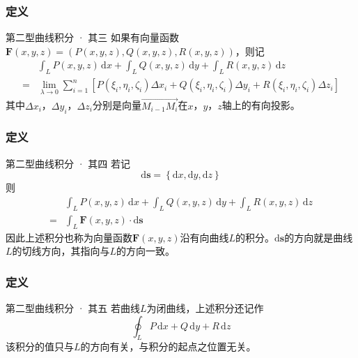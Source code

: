\documentclass[xetex]{beamer}
\begin{document}
    \begin{frame}
        \frametitle{定义}
    
        \begin{block}{第二型曲线积分 · 其三}
            如果有\alert{向量函数}$\mathbf{F}(x,y,z)=\left(P(x,y,z),Q(x,y,z),R(x,y,z)\right)$，则记
            $$\begin{aligned}
                & \int_LP(x,y,z)\,\mathrm{d}x+\int_LQ(x,y,z)\,\mathrm{d}y+\int_LR(x,y,z)\,\mathrm{d}z \\
                = & \lim_{\lambda\to 0}\sum_{i=1}^n\left[P(\xi_i,\eta_i,\zeta_i)\Delta x_i+Q(\xi_i,\eta_i,\zeta_i)\Delta y_i+R(\xi_i,\eta_i,\zeta_i)\Delta z_i\right]
            \end{aligned}$$
            其中$\Delta x_i$，$\Delta y_i$，$\Delta z_i$分别是向量$\overrightarrow{M_{i-1}M_i}$在$x$，$y$，$z$轴上的有向投影。
        \end{block}
    
    \end{frame}

    \begin{frame}
        \frametitle{定义}
    
        \begin{block}{第二型曲线积分 · 其四}
            若记$$\mathrm{d}\mathbf{s}=\left\{\mathrm{d}x,\mathrm{d}y,\mathrm{d}z\right\}$$
            则$$\begin{aligned}
                & \int_LP(x,y,z)\,\mathrm{d}x+\int_LQ(x,y,z)\,\mathrm{d}y+\int_LR(x,y,z)\,\mathrm{d}z \\
                = & \int_L\mathbf{F}(x,y,z)\cdot\mathrm{d}\mathbf{s}
            \end{aligned}$$
            因此上述积分也称为向量函数$\mathbf{F}(x,y,z)$\alert{沿有向曲线$L$的积分}。$\mathrm{d}\mathbf{s}$的方向就是曲线$L$的\alert{切线方向}，其指向\alert{与$L$的方向一致}。
        \end{block}
    
    \end{frame}

    \begin{frame}
        \frametitle{定义}
    
        \begin{block}{第二型曲线积分 · 其五}
            若曲线$L$为\alert{闭曲线}，上述积分还记作
            $$\oint_LP\,\mathrm{d}x+Q\,\mathrm{d}y+R\,\mathrm{d}z$$
            该积分的值只与$L$的方向有关，与积分的起点之位置无关。
        \end{block}
    
    \end{frame}
\end{document}
